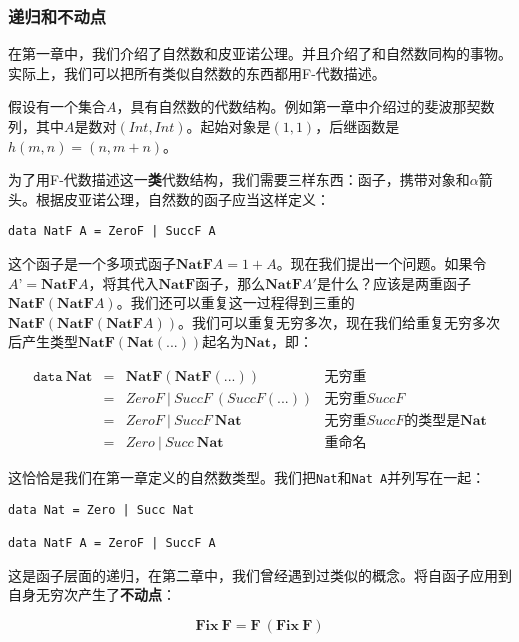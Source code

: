 \documentclass{article}
\begin{document}
\subsubsection{递归和不动点}

在第一章中，我们介绍了自然数和皮亚诺公理。并且介绍了和自然数同构的事物。实际上，我们可以把所有类似自然数的东西都用F-代数描述。

假设有一个集合$A$，具有自然数的代数结构。例如第一章中介绍过的斐波那契数列，其中$A$是数对$(Int, Int)$。起始对象是$(1, 1)$，后继函数是$h(m, n) = (n, m + n)$。

为了用F-代数描述这一\textbf{类}代数结构，我们需要三样东西：函子，携带对象和$\alpha$箭头。根据皮亚诺公理，自然数的函子应当这样定义：

\lstset{frame=none}
\begin{lstlisting}
data NatF A = ZeroF | SuccF A
\end{lstlisting}

这个函子是一个多项式函子$\mathbf{NatF} A = 1 + A$。现在我们提出一个问题。如果令$A’ = \mathbf{NatF} A$，将其代入$\mathbf{NatF}$函子，那么$\mathbf{NatF} A'$是什么？应该是两重函子$\mathbf{NatF}(\mathbf{NatF} A)$。我们还可以重复这一过程得到三重的$\mathbf{NatF}(\mathbf{NatF}(\mathbf{NatF} A))$。我们可以重复无穷多次，现在我们给重复无穷多次后产生类型$\mathbf{NatF}(\mathbf{Nat}(...))$起名为$\mathbf{Nat}$，即：

\[
\begin{array}{rcll}
\texttt{data}\ \mathbf{Nat} & = & \mathbf{NatF}(\mathbf{NatF}(...)) & \text{无穷重} \\
         & = & ZeroF\ |\ SuccF\ (SuccF (...)) & \text{无穷重}SuccF \\
         & = & ZeroF\ |\ SuccF\ \mathbf{Nat} & \text{无穷重}SuccF\text{的类型是}\mathbf{Nat} \\
         & = & Zero\ |\ Succ\ \mathbf{Nat} & \text{重命名}
\end{array}
\]

这恰恰是我们在第一章定义的自然数类型。我们把\texttt{Nat}和\texttt{Nat A}并列写在一起：

\begin{lstlisting}
data Nat = Zero | Succ Nat

data NatF A = ZeroF | SuccF A
\end{lstlisting}

这是函子层面的递归，在第二章中，我们曾经遇到过类似的概念。将自函子应用到自身无穷次产生了\textbf{不动点}：

\[
\mathbf{Fix}\ \mathbf{F} = \mathbf{F}\ (\mathbf{Fix}\ \mathbf{F})
\]
\end{document}
